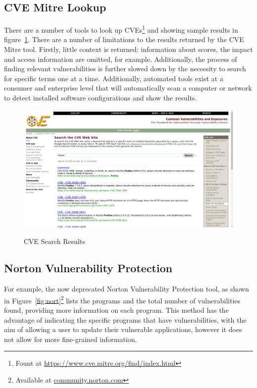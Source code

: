 \subsection{CVE Mitre Lookup}

There are a number of tools to look up CVEs\footnote{Fount at
	\url{https://www.cve.mitre.org/find/index.html}} and showing sample
results in figure~\ref{fig:cve}.  There are a number of limitations to the
results returned by the CVE Mitre tool.  Firstly, little context is returned:
information about scores, the impact and access information are omitted, for
example.  Additionally, the process of finding relevant vulnerabilities is
further slowed down by the necessity to search for specific terms one at a
time.  Additionally, automated tools exist at a consumer and enterprise level
that will automatically scan a computer or network to detect installed software
configurations and show the results.

\begin{figure} \begin{framed}\centering \includegraphics[width=0.9\linewidth]{cve-lookup}\label{fig:cve}\end{framed} \caption{CVE Search Results} \end{figure}

\subsection{Norton Vulnerability Protection}

For example, the now deprecated Norton Vulnerability Protection tool, as shown
in Figure~\ref{fig:nort}\footnote{Available at \url{community.norton.com}}
lists the programs and the total number of  vulnerabilities found, providing
more information on each program.  This method has the advantage of indicating
the specific programs that have vulnerabilities, with the aim of allowing a
user to update their vulnerable applications, however it does not allow for
more fine-grained information.



